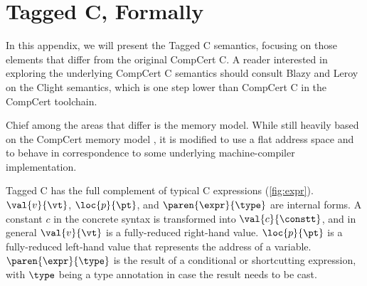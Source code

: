 \documentclass{article}
\begin{document}
\section{Tagged C, Formally}

In this appendix, we will present the Tagged C semantics, focusing on those elements
that differ from the original CompCert C. A reader interested in exploring the
underlying CompCert C semantics should consult Blazy and Leroy \cite{Blazy09:CompCertClight}
on the Clight semantics, which is one step lower than CompCert C in the CompCert toolchain.

Chief among the areas that differ is the memory model. While still heavily based on the CompCert
memory model \cite{Leroy12:CompCertMM}, it is modified to use a flat address space
and to behave in correspondence to some underlying machine-compiler implementation.

Tagged C has the full complement of typical C expressions (\cref{fig:expr}). \(\val{v}{\vt}\),
\(\loc{p}{\pt}\), and \(\paren{\expr}{\type}\) are internal forms.
A constant \(c\) in the concrete syntax is transformed into \(\val{c}{\constt}\),
and in general \(\val{v}{\vt}\) is a fully-reduced right-hand value. \(\loc{p}{\pt}\)
is a fully-reduced left-hand value that represents the address of a variable.
\(\paren{\expr}{\type}\) is the result of a conditional or shortcutting
expression, with \(\type\) being a type annotation in case the result needs to
be cast.
\end{document}

